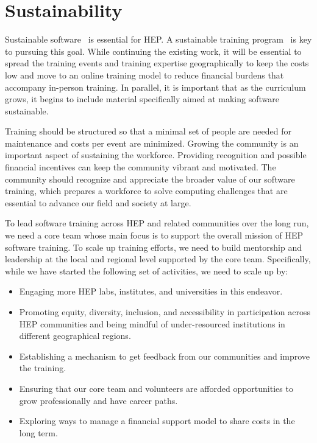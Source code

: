 \documentclass[twocolumn]{svjour3}          %
\begin{document}
\section{Sustainability}\label{sec:Sustainability}

Sustainable software~\cite{dan_katz} is essential for HEP.
A sustainable training program~\cite{sustainability_flashtalk} is key to pursuing this goal.
While continuing the existing work, it will be essential to  spread the training events and training expertise geographically to keep the costs low and move to an online training model to reduce financial burdens that accompany in-person training. In parallel, it is important that as the curriculum grows, it begins to include material specifically aimed at making software sustainable.

Training should be structured so that a minimal set of people are needed for maintenance and costs per event are minimized.
Growing the community is an important aspect of sustaining the workforce. Providing recognition and possible financial incentives can keep the community vibrant and motivated.
The community should recognize and appreciate the broader value of our software training, which prepares a workforce to solve computing challenges that are essential to advance our field and society at large.

To lead software training across HEP and related communities over the long run, we need a core team whose main focus is to support the overall mission of HEP software training. To scale up training efforts, we need to build mentorship and leadership at the local and regional level supported by the core team. Specifically, while we have started the following set of activities, we need to scale up by:
%
\begin{itemize}
\item Engaging more HEP labs, institutes, and universities in this endeavor.
\item Promoting equity, diversity, inclusion, and accessibility in participation across HEP communities and  being mindful of under-resourced institutions in different geographical regions.
\item Establishing a mechanism to get feedback from our communities and improve the training.
\item Ensuring that our core team and volunteers are afforded opportunities to grow professionally and have career paths.
\item Exploring ways to manage a financial support model to share costs in the long term.
%
\end{itemize}
\end{document}
